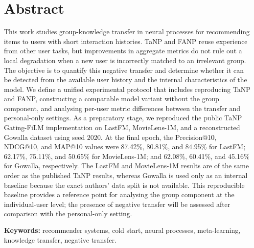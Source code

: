 \documentclass[12pt,a4paper]{article}
\begin{document}
\section*{Abstract}
This work studies group-knowledge transfer in neural processes for recommending
items to users with short interaction histories. TaNP and FANP reuse experience
from other user tasks, but improvements in aggregate metrics do not rule out a
local degradation when a new user is incorrectly matched to an irrelevant
group. The objective is to quantify this negative transfer and determine
whether it can be detected from the available user history and the internal
characteristics of the model. We define a unified experimental protocol that
includes reproducing TaNP and FANP, constructing a comparable model variant
without the group component, and analysing per-user metric differences between
the transfer and personal-only settings. As a preparatory stage, we reproduced
the public TaNP Gating-FiLM implementation on LastFM, MovieLens-1M, and a
reconstructed Gowalla dataset using seed 2020. At the final epoch, the
Precision@10, NDCG@10, and MAP@10 values were 87.42\%, 80.81\%, and 84.95\%
for LastFM; 62.17\%, 75.11\%, and 50.65\% for MovieLens-1M; and 62.08\%,
60.41\%, and 45.16\% for Gowalla, respectively. The LastFM and MovieLens-1M
results are of the same order as the published TaNP results, whereas Gowalla is
used only as an internal baseline because the exact authors' data split is not
available. This reproducible baseline provides a reference point for analysing
the group component at the individual-user level; the presence of negative
transfer will be assessed after comparison with the personal-only setting.

\vspace{0.5cm}
\noindent\textbf{Keywords:}
recommender systems, cold start, neural processes, meta-learning, knowledge
transfer, negative transfer.

\newpage
\tableofcontents
\newpage
{}

\end{document}
